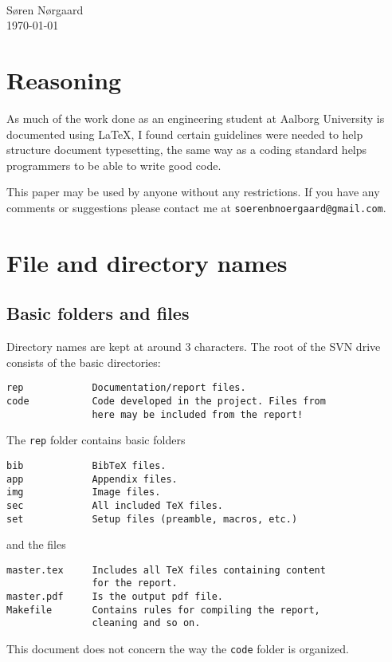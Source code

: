 

{  %
    \flushleft
    \Large {}\\
    \large \sffamily Søren Nørgaard\\
    \today\\
}\vspace{2em}


\section*{Reasoning}
\label{sec:reasoning}
As much of the work done as an engineering student at Aalborg University is documented using \LaTeX, I found certain guidelines were needed to help structure document typesetting, the same way as a coding standard helps programmers to be able to write good code.


This paper may be used by anyone without any restrictions. If you have any comments or suggestions please contact me at \texttt{soerenbnoergaard@gmail.com}.


\tableofcontents
\clearpage


\section{File and directory names}
\label{sec:files}


\subsection{Basic folders and files}
Directory names are kept at around 3 characters. The root of the SVN drive consists of the basic directories:
\begin{verbatim}
rep            Documentation/report files.
code           Code developed in the project. Files from 
               here may be included from the report!
\end{verbatim} 
The \texttt{rep} folder contains basic folders
\begin{verbatim}
bib            BibTeX files.
app            Appendix files.
img            Image files.
sec            All included TeX files.
set            Setup files (preamble, macros, etc.)
\end{verbatim}
and the files
\begin{verbatim}
master.tex     Includes all TeX files containing content 
               for the report.
master.pdf     Is the output pdf file.
Makefile       Contains rules for compiling the report, 
               cleaning and so on.
\end{verbatim}
This document does not concern the way the \texttt{code} folder is organized.


